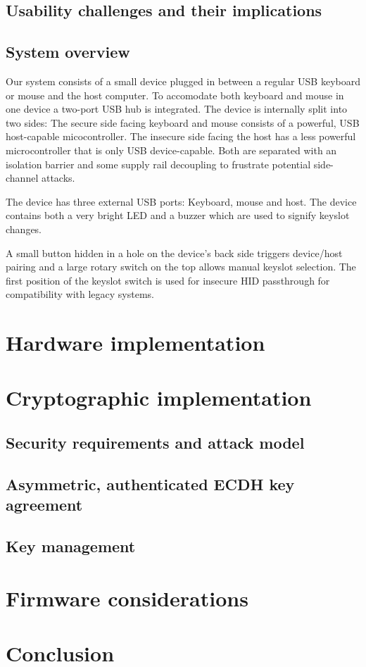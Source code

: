 \documentclass[12pt,a4paper,notitlepage]{article}
\begin{document}
\subsection{Usability challenges and their implications}

\subsection{System overview}
Our system consists of a small device plugged in between a regular USB keyboard or mouse and the host computer. To
accomodate both keyboard and mouse in one device a two-port USB hub is integrated. The device is internally split into
two sides: The secure side facing keyboard and mouse consists of a powerful, USB host-capable micocontroller. The
insecure side facing the host has a less powerful microcontroller that is only USB device-capable. Both are separated
with an isolation barrier and some supply rail decoupling to frustrate potential side-channel attacks.

The device has three external USB ports: Keyboard, mouse and host. The device contains both a very bright LED and a
buzzer which are used to signify keyslot changes.

A small button hidden in a hole on the device's back side triggers device/host pairing and a large rotary switch on the
top allows manual keyslot selection. The first position of the keyslot switch is used for insecure HID passthrough for
compatibility with legacy systems.

\section{Hardware implementation}

\section{Cryptographic implementation}
\subsection{Security requirements and attack model}
\subsection{Asymmetric, authenticated ECDH key agreement}
\subsection{Key management}

\section{Firmware considerations}

\section{Conclusion}


\nocite{*}

\end{document}
